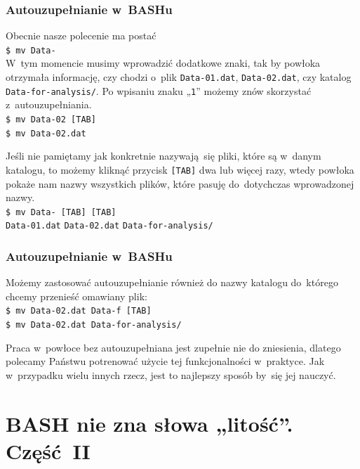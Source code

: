 \documentclass[10pt,t]{beamer}
\begin{document}
\begin{frame}
  \frametitle{Autouzupełnianie w~BASHu}


  Obecnie nasze polecenie ma postać \\
  \texttt{\$ mv Data-} \\
  W~tym momencie musimy wprowadzić dodatkowe znaki, tak by powłoka otrzymała
  informację, czy chodzi o~plik \texttt{Data-01.dat},
  \texttt{Data-02.dat}, czy katalog \texttt{Data-for-analysis/}. Po wpisaniu
  znaku „\texttt{1}” możemy znów skorzystać z~autouzupełniania. \\
  \texttt{\$ mv Data-02 [TAB]} \\
  \texttt{\$ mv Data-02.dat}

  Jeśli nie pamiętamy jak konkretnie nazywają~się pliki, które są w~danym
  katalogu, to możemy kliknąć przycisk \texttt{[TAB]} dwa lub więcej razy,
  wtedy powłoka pokaże nam nazwy wszystkich plików, które pasuję
  do~dotychczas wprowadzonej nazwy. \\
  \texttt{\$ mv Data- [TAB] \hspace{-1em} [TAB]} \\
  \texttt{Data-01.dat} \quad \texttt{Data-02.dat} \quad \texttt{Data-for-analysis/}

\end{frame}





\begin{frame}
  \frametitle{Autouzupełnianie w~BASHu}


  Możemy zastosować autouzupełnianie również do nazwy katalogu do~którego
  chcemy przenieść omawiany plik: \\
  \texttt{\$ mv Data-02.dat Data-f [TAB]} \\
  \texttt{\$ mv Data-02.dat Data-for-analysis/}

  Praca w~powłoce bez autouzupełniana jest zupełnie nie do zniesienia,
  dlatego polecamy Państwu potrenować użycie tej funkcjonalności w~praktyce.
  Jak w~przypadku wielu innych rzecz, jest to najlepszy sposób by~się jej
  nauczyć.

\end{frame}










\section{BASH nie zna słowa „litość”. Część~II}
\end{document}
